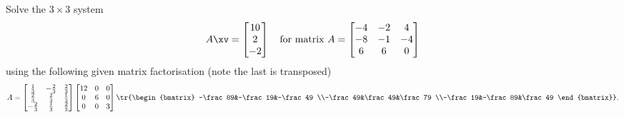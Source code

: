 \begin{example} \label{eg:3by3svd}
Solve the \(3\times3\) system
\begin{equation*}
A\xv=\begin{bmatrix} 10\\2\\-2 \end{bmatrix}
\quad\text{for matrix }A=\begin{bmatrix}-4&-2&4
\\-8&-1&-4
\\6&6&0\end{bmatrix}
\end{equation*}
using the following given matrix factorisation (note the last is transposed)
\begin{equation*}
A=\begin{bmatrix} \frac13&-\frac23&\frac23
\\\frac23&\frac23&\frac13
\\-\frac23&\frac13&\frac23 \end{bmatrix}
\begin{bmatrix} 12&0&0\\0&6&0\\0&0&3 \end{bmatrix}
\tr{\begin{bmatrix} -\frac89&-\frac19&-\frac49
\\-\frac49&\frac49&\frac79
\\-\frac19&-\frac89&\frac49 \end{bmatrix}}.
\end{equation*}


\end{example}
